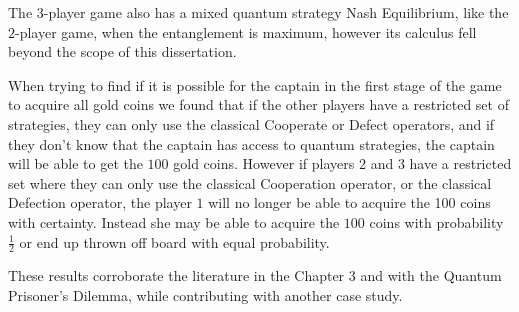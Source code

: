 The $3$-player game also has a mixed quantum strategy Nash Equilibrium, like the $2$-player game, when the entanglement is maximum, however its calculus fell beyond the scope of this dissertation. 

When trying to find if it is possible for the captain in the first stage of the game to acquire all gold coins we found that if the other players have a restricted set of strategies, they can only use the classical Cooperate or Defect operators, and if they don't know that the captain has access to quantum strategies, the captain will be able to get the $100$ gold coins. However if players $2$ and $3$ have a restricted set where they can only use the classical Cooperation operator, or the classical Defection operator, the player $1$ will no longer be able to acquire the 100 coins with certainty. Instead she may be able to acquire the $100$ coins with probability $\frac{1}{2}$ or end up thrown off board with equal probability.

These results corroborate the literature in the Chapter 3 and with the Quantum Prisoner's Dilemma, while contributing with another case study.


 






